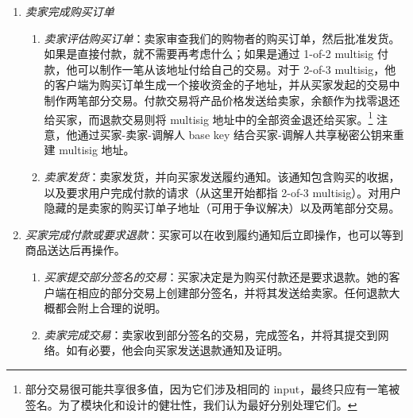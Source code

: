 \begin{enumerate}
\begin{enumerate}
        实际上，她只需要这两笔交易的承诺值，然后分别是一份部分 key image（附合法性证明）和一份她的购物会话子地址。该子地址具有双重用途：它是买家接收退款或找零 output 的地址，其 spend key 是买家的 multisig base key。\footnote{发起独立的交易很重要，因为承诺值只能使用一次。}
        \item {\em 买家授权付款}：在查看所有购买订单细节后，购物者授权付款。\footnote{如果买家取消购买订单，她的注入资金交易和部分 multisig 交易将被删除。} 她的客户端完成注入资金交易的签名，并将其提交到网络。\footnote{如果她的购物车包含多个卖家的产品，那么她的客户端可以创建多份购买订单并分别处理。所有卖家都可以由同一笔注入资金交易来支付。} 它将购买订单连同注入资金交易的 hash 和已发起的 multisig 交易以及买家-调解人共享秘密公钥发送给卖家。\footnote{买家的客户端应记录付款订单的细节，如总价格，以便稍后在签名前验证 multisig 交易的内容。}
    \end{enumerate}{}
    \item {\em 卖家完成购买订单}
    \begin{enumerate}
        \item {\em 卖家评估购买订单}：卖家审查我们的购物者的购买订单，然后批准发货。如果是直接付款，就不需要再考虑什么；如果是通过 1-of-2 multisig 付款，他可以制作一笔从该地址付给自己的交易。对于 2-of-3 multisig，他的客户端为购买订单生成一个接收资金的子地址，并从买家发起的交易中制作两笔部分交易。付款交易将产品价格发送给卖家，余额作为找零退还给买家，而退款交易则将 multisig 地址中的全部资金退还给买家。\footnote{部分交易很可能共享很多值，因为它们涉及相同的 input，最终只应有一笔被签名。为了模块化和设计的健壮性，我们认为最好分别处理它们。} 注意，他通过买家-卖家-调解人 base key 结合买家-调解人共享秘密公钥来重建 multisig 地址。
        \item {\em 卖家发货}：卖家发货，并向买家发送履约通知。该通知包含购买的收据，以及要求用户完成付款的请求（从这里开始都指 2-of-3 multisig）。对用户隐藏的是卖家的购买订单子地址（可用于争议解决）以及两笔部分交易。
    \end{enumerate}{}
    \item {\em 买家完成付款或要求退款}：买家可以在收到履约通知后立即操作，也可以等到商品送达后再操作。
    \begin{enumerate}
        \item {\em 买家提交部分签名的交易}：买家决定是为购买付款还是要求退款。她的客户端在相应的部分交易上创建部分签名，并将其发送给卖家。任何退款大概都会附上合理的说明。
        \item {\em 卖家完成交易}：卖家收到部分签名的交易，完成签名，并将其提交到网络。如有必要，他会向买家发送退款通知及证明。

\end{enumerate}
\end{enumerate}
